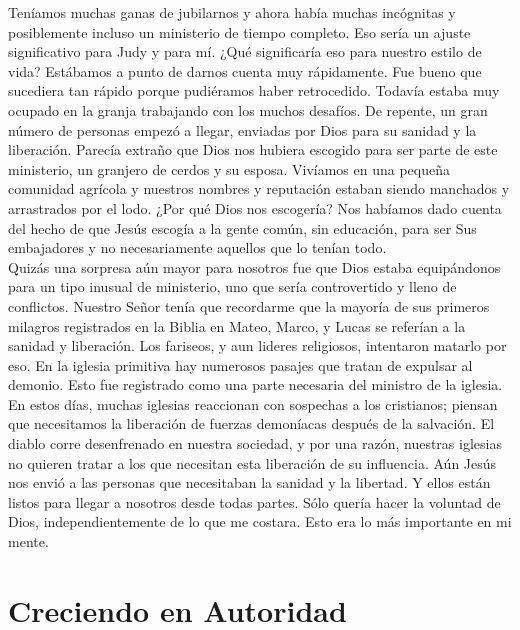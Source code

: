 \documentclass[twoside, 12pt]{book}
\begin{document}
Teníamos muchas ganas de jubilarnos y ahora había muchas incógnitas y posiblemente incluso un ministerio de tiempo completo.  Eso sería un ajuste significativo para Judy y para mí.  ¿Qué significaría eso para nuestro estilo de vida?
Estábamos a punto de darnos cuenta muy rápidamente.  Fue bueno que sucediera tan rápido porque pudiéramos haber retrocedido. Todavía estaba muy ocupado en la granja trabajando con los muchos desafíos. De repente, un gran número de personas empezó a llegar, enviadas por Dios para su sanidad y la liberación.  Parecía extraño que Dios nos hubiera escogido para ser parte de este ministerio, un granjero de cerdos y su esposa.  Vivíamos en una pequeña comunidad agrícola y nuestros nombres y reputación estaban siendo manchados y arrastrados por el lodo.  ¿Por qué Dios nos escogería? Nos habíamos dado cuenta del hecho de que Jesús escogía a la gente común, sin educación, para ser Sus embajadores y no necesariamente aquellos que lo tenían todo.\\

Quizás una sorpresa aún mayor para nosotros fue que Dios estaba equipándonos para un tipo inusual de ministerio, uno que sería controvertido y lleno de conflictos. Nuestro Señor tenía que recordarme que la mayoría de sus primeros milagros registrados en la Biblia en Mateo, Marco, y Lucas se referían a la sanidad y liberación. Los fariseos, y aun lideres religiosos, intentaron matarlo por eso. En la iglesia primitiva hay numerosos pasajes que tratan de expulsar al demonio. Esto fue registrado como una parte necesaria del ministro de la iglesia. En estos días, muchas iglesias reaccionan con sospechas a los cristianos; piensan que necesitamos la liberación de fuerzas demoníacas después de la salvación. El diablo corre desenfrenado en nuestra sociedad, y por una razón, nuestras iglesias no quieren tratar a los que necesitan esta liberación de su influencia. Aún Jesús nos envió a las personas que necesitaban la sanidad y la libertad. Y ellos están listos para llegar a nosotros desde todas partes.  Sólo quería hacer la voluntad de Dios, independientemente de lo que me costara.  Esto era lo más importante en mi mente.\\





\chapter{Creciendo en Autoridad}
\
\end{document}
